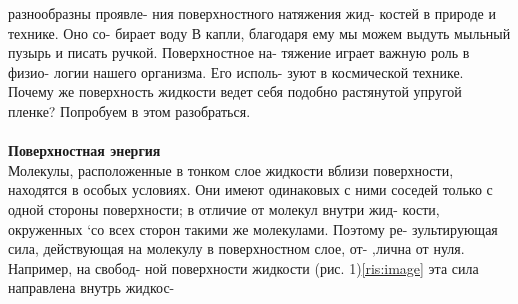 \documentclass{article}
\begin{document}
\setlength{\columnsep}{30pt}
\begin{multicols}{2}
\large
{} разнообразны проявле-\linebreak
ния поверхностного натяжения жид-\linebreak
костей в природе и технике. Оно со-\linebreak
бирает воду В капли, благодаря ему\linebreak
мы можем выдуть мыльный пузырь\linebreak
и писать ручкой. Поверхностное на-\linebreak
тяжение играет важную роль в физио-\linebreak
логии нашего организма. Его исполь-\linebreak
зуют в космической технике. Почему\linebreak
же поверхность жидкости ведет себя\linebreak
подобно растянутой упругой пленке?\linebreak
Попробуем в этом разобраться. \\ \\
\large
\textbf{Поверхностная энергия}\\
\large
Молекулы, расположенные в тонком\linebreak
слое жидкости вблизи поверхности,\linebreak
находятся в особых условиях. Они\linebreak
имеют одинаковых с ними соседей\linebreak
только с одной стороны поверхности;\linebreak
в отличие от молекул внутри жид-\linebreak
кости, окруженных ‘со всех сторон\linebreak
такими же молекулами. Поэтому ре-\linebreak
зультирующая сила, действующая на\linebreak
молекулу в поверхностном слое, от-\linebreak
‚лична от нуля. Например, на свобод-\linebreak
ной поверхности жидкости (рис. 1)\ref{ris:image}\linebreak
эта сила направлена внутрь жидкос-



\end{multicols}
\end{document}
